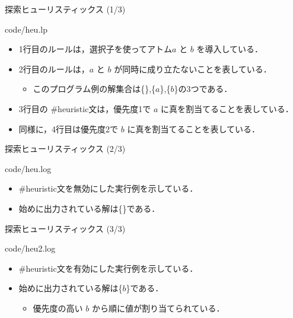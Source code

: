 \documentclass[11pt,dvipdfmx]{beamer}
\begin{document}
\begin{frame}{探索ヒューリスティックス (1/3)}

{code/heu.lp}

\begin{block}{}
\begin{itemize}
\item 1行目のルールは，選択子を使ってアトム$a$ と $b$ を導入している．
\item 2行目のルールは，$a$ と $b$ が同時に成り立たないことを表している．
 \begin{itemize}
  \item このプログラム例の解集合は\{\},\{$a$\},\{$b$\}の3つである．
 \end{itemize}
\item 3行目の \#heuristic文は，優先度1で $a$ に真を割当てることを表している．
\item 同様に，4行目は優先度2で $b$ に真を割当てることを表している．
\end{itemize}
\end{block}
\end{frame}
\begin{frame}{探索ヒューリスティックス (2/3)}

{code/heu.log}

\begin{block}{}
\begin{itemize}
\item \#heuristic文を無効にした実行例を示している．
\item 始めに出力されている解は\{\}である．
\end{itemize}
\end{block}
\end{frame}
\begin{frame}{探索ヒューリスティックス (3/3)}

{code/heu2.log}

\begin{block}{}
\begin{itemize}
\item \#heuristic文を有効にした実行例を示している．
\item 始めに出力されている解は\{$b$\}である．
 \begin{itemize}
  \item 優先度の高い $b$ から順に値が割り当てられている．
 \end{itemize}
\end{itemize}
\end{block}
\end{frame}
\end{document}

